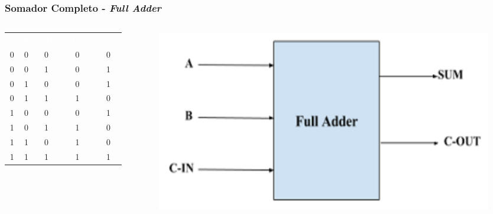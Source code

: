 \documentclass[aspectratio=169,
				xcolor=table]{beamer}
\begin{document}
		\begin{frame}
			\frametitle{Somador Completo - \textit{Full Adder}}
			\begin{columns}
				\begin{column}{0.3\textwidth}
					\begin{eftable}
						\begin{tabular}{c|c|c||c|c}				
							\textcolor{white}{A} & 		
							\textcolor{white}{B} & 		
							\textcolor{white}{C-IN} & 		
							\textcolor{white}{C-OUT} & 		
							\textcolor{white}{SUM} \\ 
							0 & 0 & 0 & 0 & 0 \\ 
							0 & 0 & 1 & 0 & 1 \\ 
							0 & 1 & 0 & 0 & 1 \\ 
							0 & 1 & 1 & 1 & 0 \\ 
							1 & 0 & 0 & 0 & 1 \\ 
							1 & 0 & 1 & 1 & 0 \\ 
							1 & 1 & 0 & 1 & 0 \\ 
							1 & 1 & 1 & 1 & 1 \\ 
						\end{tabular} 
					\end{eftable}
				\end{column}
				\begin{column}{0.7\textwidth}
					\begin{figure}
						\centering
						\includegraphics[width=.8\textwidth, keepaspectratio]{../figs/cap05/fullAdder.png} 
					\end{figure}
				\end{column}
			\end{columns}			
			
		\end{frame}
\end{document}
